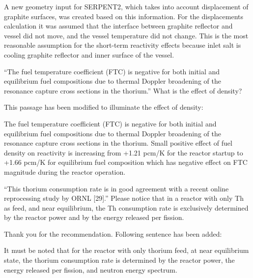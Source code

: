 \documentclass[answers,11pt]{exam}
\begin{document}
\begin{questions}
\begin{solution}
                A new geometry input for SERPENT2, which takes into account 
                displacement of graphite surfaces, was created based on this information. 
                For the displacements calculation it was assumed that the interface 
                between graphite reflector and vessel did not move, and the vessel 
                temperature did not change. This is the most reasonable assumption for 
				the short-term reactivity effects because inlet salt is cooling graphite 
				reflector and inner surface of the vessel.
        \end{solution}


        \question ``The fuel temperature coefficient (FTC) is negative for both 
        initial and equilibrium fuel compositions due to thermal Doppler 
        broadening of the resonance capture cross sections in the thorium.'' 
        What is the effect of density?
        \begin{solution}
                This passage has been modified to illuminate the effect of density:
                
				The fuel temperature coefficient (FTC) is negative for both initial and 
				equilibrium fuel compositions due to thermal Doppler broadening of the 
				resonance capture cross sections in the thorium. Small positive effect 
				of fuel density on reactivity is increasing from +1.21 pcm/K for the 
				reactor startup to +1.66 pcm/K for equilibrium fuel composition which 
				has negative effect on FTC magnitude during the reactor operation. 
        \end{solution}


        \question ``This thorium consumption rate is in good agreement with a 
        recent online reprocessing study by ORNL [29].'' Please notice that in a 
        reactor with only Th as feed, and near equilibrium, the Th consumption 
        rate is  exclusively determined by the reactor power and by the energy 
        released per fission.  
        \begin{solution}
                Thank you for the recommendation. Following sentence has been 
                added:
                
                It must be noted that for the reactor with only thorium feed, 
                at near equilibrium state, the thorium consumption rate is 
				determined by the reactor power, the energy released per fission, 
				and neutron energy spectrum.
        \end{solution}


\end{questions}
\end{document}
